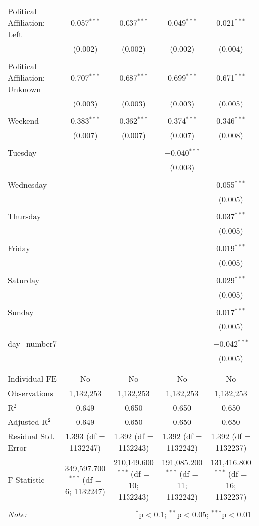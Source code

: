 \documentclass[
]{article}
\begin{document}
\begin{table}[!htbp]
{\begin{tabular}{@{\extracolsep{5pt}}lcccc}
 Political Affiliation: Left & 0.057$^{***}$ & 0.037$^{***}$ & 0.049$^{***}$ & 0.021$^{***}$ \\ 
  & (0.002) & (0.002) & (0.002) & (0.004) \\ 
  & & & & \\ 
 Political Affiliation: Unknown & 0.707$^{***}$ & 0.687$^{***}$ & 0.699$^{***}$ & 0.671$^{***}$ \\ 
  & (0.003) & (0.003) & (0.003) & (0.005) \\ 
  & & & & \\ 
 Weekend & 0.383$^{***}$ & 0.362$^{***}$ & 0.374$^{***}$ & 0.346$^{***}$ \\ 
  & (0.007) & (0.007) & (0.007) & (0.008) \\ 
  & & & & \\ 
 Tuesday &  &  & $-$0.040$^{***}$ &  \\ 
  &  &  & (0.003) &  \\ 
  & & & & \\ 
 Wednesday &  &  &  & 0.055$^{***}$ \\ 
  &  &  &  & (0.005) \\ 
  & & & & \\ 
 Thursday &  &  &  & 0.037$^{***}$ \\ 
  &  &  &  & (0.005) \\ 
  & & & & \\ 
 Friday &  &  &  & 0.019$^{***}$ \\ 
  &  &  &  & (0.005) \\ 
  & & & & \\ 
 Saturday &  &  &  & 0.029$^{***}$ \\ 
  &  &  &  & (0.005) \\ 
  & & & & \\ 
 Sunday &  &  &  & 0.017$^{***}$ \\ 
  &  &  &  & (0.005) \\ 
  & & & & \\ 
 day\_number7 &  &  &  & $-$0.042$^{***}$ \\ 
  &  &  &  & (0.005) \\ 
  & & & & \\ 
\hline \\[-1.8ex] 
Individual FE & No & No & No & No \\ 
Observations & 1,132,253 & 1,132,253 & 1,132,253 & 1,132,253 \\ 
R$^{2}$ & 0.649 & 0.650 & 0.650 & 0.650 \\ 
Adjusted R$^{2}$ & 0.649 & 0.650 & 0.650 & 0.650 \\ 
Residual Std. Error & 1.393 (df = 1132247) & 1.392 (df = 1132243) & 1.392 (df = 1132242) & 1.392 (df = 1132237) \\ 
F Statistic & 349,597.700$^{***}$ (df = 6; 1132247) & 210,149.600$^{***}$ (df = 10; 1132243) & 191,085.200$^{***}$ (df = 11; 1132242) & 131,416.800$^{***}$ (df = 16; 1132237) \\ 
\hline 
\hline \\[-1.8ex] 
\textit{Note:}  & \multicolumn{4}{r}{$^{*}$p$<$0.1; $^{**}$p$<$0.05; $^{***}$p$<$0.01} \\ 
\end{tabular}
} 
\end{table} 
\newpage
\end{document}
